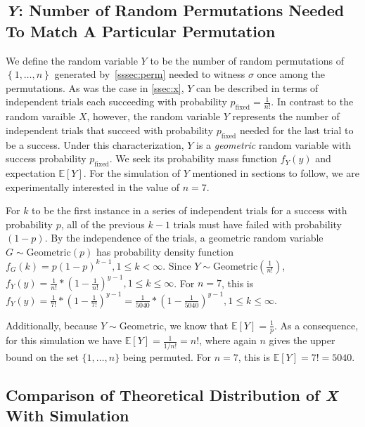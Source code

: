 \documentclass[11pt, oneside]{article}   	%
\begin{document}
\subsection{\textit{Y}: Number of Random Permutations Needed To Match A Particular Permutation}
We define the random variable $Y$ to be the number of random permutations of $\left\{1, \dots, n\right\}$ generated by~\ref{sssec:perm} needed to witness $\sigma$ once among the permutations. As was the case in \ref{ssec:x}, $Y$ can be described in terms of independent trials each succeeding with probability $p_{\text{fixed}} = \frac{1}{n!}$. In contrast to the random varaible $X$, however, the random variable $Y$ represents the number of independent trials that succeed with probability $p_{\text{fixed}}$ needed for the last trial to be a success. Under this characterization, $Y$ is a \textit{geometric} random variable with success probability $p_{\text{fixed}}$. We seek its probability mass function $f_Y(y)$ and expectation $\mathbb{E}[Y]$. For the simulation of $Y$ mentioned in sections to follow, we are experimentally interested in the value of $n = 7$.

For $k$ to be the first instance in a series of independent trials for a success with probability $p$, all of the previous $k - 1$ trials must have failed with probability $(1 - p)$. By the independence of the trials, a geometric random variable $G \sim \text{Geometric}(p)$ has probability density function $f_G(k) = p(1-p)^{k-1}, 1 \leq k < \infty$. Since $Y \sim \text{Geometric}(\frac{1}{n!})$, $f_Y(y) = \frac{1}{n!} * (1 - \frac{1}{n!})^{y-1}, 1 \leq k \leq \infty$. For $n = 7$, this is $f_Y(y) = \frac{1}{7!} * (1 - \frac{1}{7!})^{y-1} = \frac{1}{5040} * (1 - \frac{1}{5040})^{y-1}, 1 \leq k \leq \infty$.

Additionally, because $Y \sim \text{Geometric}$, we know that $\mathbb{E}[Y] = \frac{1}{p}$. As a consequence, for this simulation we have $\mathbb{E}[Y] = \frac{1}{1/n!} = n!$, where again $n$ gives the upper bound on the set $\{1, \dots, n\}$ being permuted. For $n = 7$, this is $\mathbb{E}[Y] = 7! = 5040$.

\subsection{Comparison of Theoretical Distribution of \textit{X} With Simulation}
\end{document}

